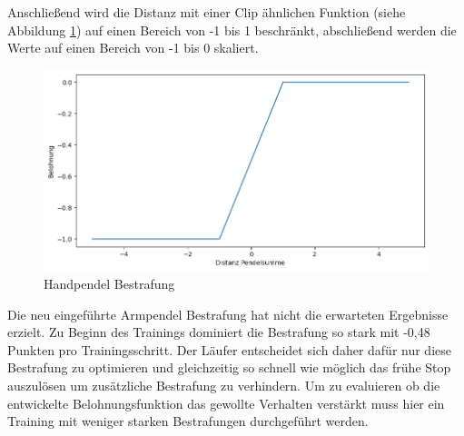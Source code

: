 Anschließend wird die Distanz mit einer Clip ähnlichen Funktion (siehe Abbildung \ref{fig:plot_hand_pendel}) auf einen Bereich von -1 bis 1 beschränkt, abschließend werden die Werte auf einen Bereich von -1 bis 0 skaliert.

\begin{figure}[H]
  \centering  
  \includegraphics[width=\textwidth]{img/plot_hand_pendel}
  \caption{Handpendel Bestrafung}
  \label{fig:plot_hand_pendel}
\end{figure}

Die neu eingeführte Armpendel Bestrafung hat nicht die erwarteten Ergebnisse erzielt. Zu Beginn des Trainings dominiert die Bestrafung so stark mit -0,48 Punkten pro Trainingsschritt. Der Läufer entscheidet sich daher dafür nur diese Bestrafung zu optimieren und gleichzeitig so schnell wie möglich das frühe Stop auszulösen um zusätzliche Bestrafung zu verhindern. Um zu evaluieren ob die entwickelte Belohnungsfunktion das gewollte Verhalten verstärkt muss hier ein Training mit weniger starken Bestrafungen durchgeführt werden.

